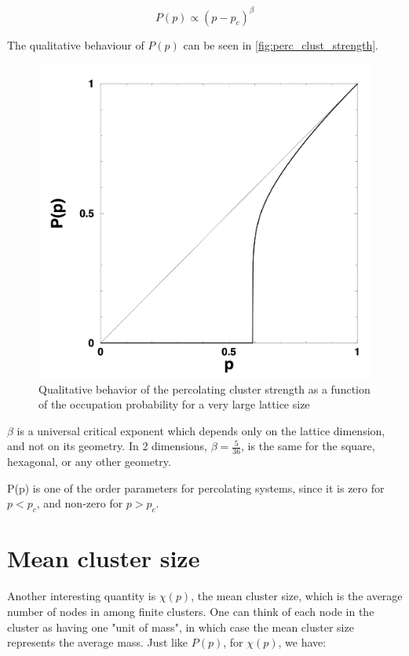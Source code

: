 $$
    P(p) \propto (p - p_c)^\beta 
$$

The qualitative behaviour of $P(p)$ can be seen in \autoref{fig:perc_clust_strength}.


\begin{figure}[H]
  \includegraphics[width=\linewidth]{Images/perc_clust_strength.png}
  \caption{Qualitative behavior of the percolating cluster strength as a function of the occupation probability for a very large lattice size}
  \label{fig:perc_clust_strength}
\end{figure}



$\beta$ is a universal critical exponent which depends only on the lattice dimension, and not on its geometry. In 2 dimensions, $\beta = \frac{5}{36}$, is the same for the square, hexagonal, or any other geometry\cite{intro_to_percolation_theory}. 

P(p) is one of the order parameters for percolating systems, since it is zero for $p < p_c$, and non-zero for $p > p_c$.


\section{Mean cluster size}
\label{sec:th_mean_cluster_size}

Another interesting quantity is $\chi(p)$, the mean cluster size, which is the average number of nodes in among finite clusters. One can think of each node in the cluster as having one "unit of mass", in which case the mean cluster size represents the average mass. Just like $P(p)$, for $\chi(p)$, we have\cite{intro_to_percolation_theory}:

